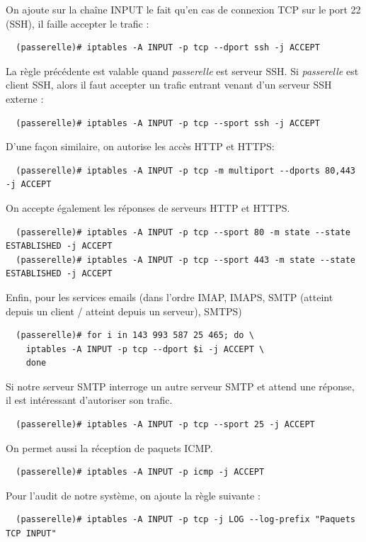 \documentclass[a4paper]{article}
\begin{document}
On ajoute sur la chaîne INPUT le fait qu'en cas de connexion
TCP sur le port 22 (SSH), il faille accepter le trafic :
\begin{verbatim}
  (passerelle)# iptables -A INPUT -p tcp --dport ssh -j ACCEPT
\end{verbatim}
La règle précédente est valable quand \textit{passerelle} est serveur SSH.
Si \textit{passerelle} est client SSH, alors il faut accepter
un trafic entrant venant d'un serveur SSH externe :
\begin{verbatim}
  (passerelle)# iptables -A INPUT -p tcp --sport ssh -j ACCEPT
\end{verbatim}

D'une façon similaire, on autorise les accès HTTP et HTTPS:
\begin{verbatim}
  (passerelle)# iptables -A INPUT -p tcp -m multiport --dports 80,443 -j ACCEPT
\end{verbatim}
On accepte également les réponses de serveurs HTTP et HTTPS.
\begin{verbatim}
  (passerelle)# iptables -A INPUT -p tcp --sport 80 -m state --state ESTABLISHED -j ACCEPT
  (passerelle)# iptables -A INPUT -p tcp --sport 443 -m state --state ESTABLISHED -j ACCEPT
\end{verbatim}

Enfin, pour les services emails (dans l'ordre IMAP, IMAPS,
SMTP (atteint depuis un client / atteint depuis un serveur), SMTPS)
\begin{verbatim}
  (passerelle)# for i in 143 993 587 25 465; do \
    iptables -A INPUT -p tcp --dport $i -j ACCEPT \
    done
\end{verbatim}

Si notre serveur SMTP interroge un autre serveur SMTP et attend une réponse, 
il est intéressant d'autoriser son trafic.
\begin{verbatim}
  (passerelle)# iptables -A INPUT -p tcp --sport 25 -j ACCEPT
\end{verbatim}

On permet aussi la réception de paquets ICMP.
\begin{verbatim}
  (passerelle)# iptables -A INPUT -p icmp -j ACCEPT
\end{verbatim}

Pour l'audit de notre système, on ajoute la règle suivante :
\begin{verbatim}
  (passerelle)# iptables -A INPUT -p tcp -j LOG --log-prefix "Paquets TCP INPUT"
\end{verbatim}
\end{document}
